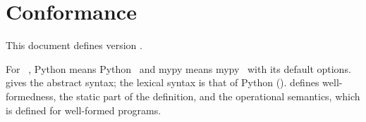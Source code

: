\section{Conformance}
\label{sec:conformance}

This document defines \PurePy version \versionstring.

For \PurePy~\versionstring, Python means Python~\pythonVersion{} and mypy means mypy~\mypyVersion{} with its default options.  gives the abstract syntax; the lexical syntax is
that of Python ().  defines well-formedness, the static part of
the definition, and  the operational semantics, which is defined for well-formed programs.





